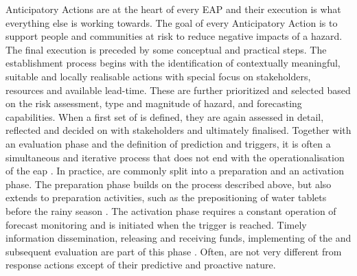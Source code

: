
Anticipatory Actions are at the heart of every EAP and their execution is what everything else is working towards. The goal of every Anticipatory Action is to support people and communities at risk to reduce negative impacts of a hazard. The final execution is preceded by some conceptual and practical steps. The establishment process begins with the identification of contextually meaningful, suitable and locally realisable actions with special focus on stakeholders, resources and available lead-time. These are further prioritized and selected based on the risk assessment, type and magnitude of hazard, and forecasting capabilities. When a first set of  is defined, they are again assessed in detail, reflected and decided on with stakeholders and ultimately finalised. Together with an evaluation phase and the definition of prediction and triggers, it is often a simultaneous and iterative process that does not end with the operationalisation of the \acrshort{eap} \autocite{elisabethstephensFORECASTBASEDACTION2015,ifrcGlossaryTermsForecastbased2023,ifrcFbFPractitionersManual2023a,rcrcFORECASTBASEDFINANCINGEARLY2020}.\newline
In practice,  are commonly split into a preparation and an activation phase. The preparation phase builds on the process described above, but also extends to preparation activities, such as the prepositioning of water tablets before the rainy season \autocite{elisabethstephensFORECASTBASEDACTION2015}. The activation phase requires a constant operation of forecast monitoring and is initiated when the trigger is reached. Timely information dissemination, releasing and receiving funds, implementing of the  and subsequent evaluation are part of this phase \autocite{elisabethstephensFORECASTBASEDACTION2015,ifrcFbFPractitionersManual2023a}. Often,  are not very different from response actions except of their predictive and proactive nature.\newline
